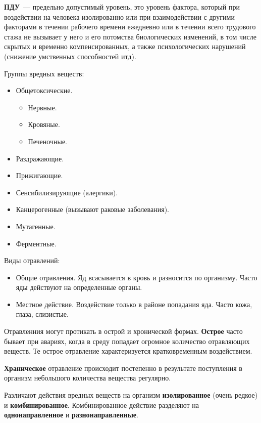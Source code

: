 \textbf{ПДУ}~--- предельно допустимый уровень, это уровень фактора, который при воздействии на человека изолированно или при взаимодействии с другими факторами в течении рабочего времени ежедневно или в течении всего трудового стажа не вызывает у него и его потомства биологических изменений, в том числе скрытых и временно компенсированных, а также психологических нарушений (снижение умственных способностей итд).

Группы вредных веществ:
\begin{itemize}
	\item Общетоксические.
		\begin{itemize}
			\item Нервные.
			\item Кровяные.
			\item Печеночные.
		\end{itemize}
	\item Раздражающие.
	\item Прижигающие.
	\item Сенсибилизирующие (алергики).
	\item Канцерогенные (вызывают раковые заболевания).
	\item Мутагенные.
	\item Ферментные.
\end{itemize}

Виды отравлений:
\begin{itemize}
	\item Общие отравления. Яд всасывается в кровь и разносится по организму. Часто яды действуют на определенные органы.
	\item Местное действие. Воздействие только в районе попадания яда. Часто кожа, глаза, слизистые.
\end{itemize}

Отравленния могут протикать в острой и хронической формах. \textbf{Острое} часто бывает при авариях, когда в среду попадает огромное количество отравляющих веществ. Те острое отравление характеризуется кратковременным воздействием.

\textbf{Храническое} отравление происходит постепенно в результате поступления в организм небольшого количества вещества регулярно.

Различают действия вредных веществ на организм \textbf{изолированное} (очень редкое) и \textbf{комбинированное}. Комбинированное действие разделяют на \textbf{однонаправленное} и \textbf{разнонаправленные}.